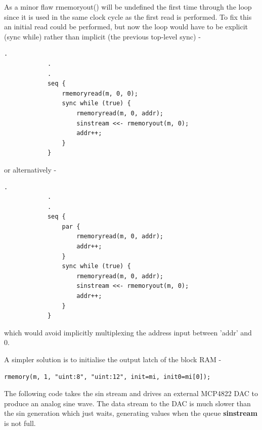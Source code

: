         As a minor flaw rmemoryout() will be undefined the first time through
        the loop since it is used in the same clock cycle as the first read is
        performed. To fix this an initial read could be performed, but now the
        loop would have to be explicit (sync while) rather than implicit
        (the previous top-level sync) -
        \begin{lstlisting}[gobble=8, language=threepl]
            .
            .
            .
            seq {
                rmemoryread(m, 0, 0);
                sync while (true) {
                    rmemoryread(m, 0, addr);
                    sinstream <<- rmemoryout(m, 0);
                    addr++;
                }
            }
        \end{lstlisting}
        or alternatively -
        \begin{lstlisting}[gobble=8, language=threepl]
            .
            .
            .
            seq {
                par {
                    rmemoryread(m, 0, addr);
                    addr++;
                }
                sync while (true) {
                    rmemoryread(m, 0, addr);
                    sinstream <<- rmemoryout(m, 0);
                    addr++;
                }
            }
        \end{lstlisting}
        which would avoid implicitly multiplexing the address input between
        'addr' and 0.
        
        A simpler solution is to initialise the output latch of the block
        RAM -
        \begin{lstlisting}[gobble=8, language=threepl]
            rmemory(m, 1, "uint:8", "uint:12", init=mi, init0=mi[0]);
        \end{lstlisting}

        The following code takes the sin stream and drives an external MCP4822
        DAC to produce an analog sine wave. The data stream to the DAC is much
        slower than the sin generation which just waits, generating values when
        the queue {\bf sinstream} is not full.
        
